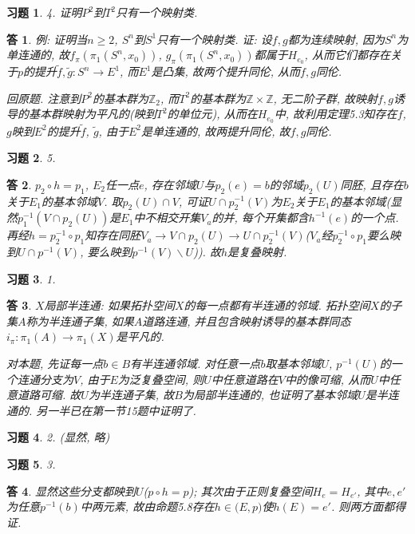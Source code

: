\documentclass{ctexart}%
\newtheorem*{exercise}{习题}
\newtheorem*{solution}{答}
\theoremstyle{definition}
\theoremstyle{remark}
\begin{document}
\begin{exercise}4. 证明$P^2$到$T^2$只有一个映射类.
\end{exercise}
\begin{solution}
例: 证明当$n\geq 2$, $S^n$到$S^1$只有一个映射类. 证: 设$f,g$都为连续映射, 因为$S^n$为单连通的, 故$f_\pi(\pi_1(S^n,x_0))$, $g_\pi(\pi_1(S^n,x_0))$都属于$H_{e_0}$, 从而它们都存在关于$p$的提升$\tilde{f}, \tilde{g}:S^n\rightarrow E^1$, 而$E^1$是凸集, 故两个提升同伦, 从而$f,g$同伦. 

回原题. 注意到$P^2$的基本群为$\mathbb{Z}_2$, 而$T^2$的基本群为$\mathbb{Z}\times \mathbb{Z}$, 无二阶子群, 故映射$f,g$诱导的基本群映射为平凡的(映到$T^2$的单位元), 从而在$H_{e_0}$中, 故利用定理5.3知存在$f$, $g$映到$E^2$的提升$\tilde{f}$, $\tilde{g}$, 由于$E^2$是单连通的, 故两提升同伦, 故$f,g$同伦. 
\end{solution}

\begin{exercise}5.
\end{exercise}
\begin{solution}
$p_2\circ h = p_1$, $E_2$任一点$e$, 存在邻域$U$与$p_2(e)=b$的邻域$p_2(U)$同胚, 且存在$b$关于$E_1$的基本邻域$V$. 取$p_2(U)\cap V$, 可证$U\cap p^{-1}_2(V)$为$E_2$关于$E_1$的基本邻域(显然$p^{-1}_1(V\cap p_2(U))$是$E_1$中不相交开集$V_a$的并, 每个开集都含$h^{-1}(e)$的一个点. 再经$h=p^{-1}_2\circ p_1$知存在同胚$V_a\rightarrow V\cap p_2(U)\rightarrow U\cap p^{-1}_2(V)$($V_a$经$p^{-1}_2\circ p_1$要么映到$U\cap p^{-1}(V)$, 要么映到$p^{-1}(V)\backslash U$)). 故$h$是复叠映射.
\end{solution}

\begin{exercise}1.
\end{exercise}
\begin{solution}
$X$局部半连通: 如果拓扑空间$X$的每一点都有半连通的邻域. 拓扑空间$X$的子集$A$称为半连通子集, 如果$A$道路连通, 并且包含映射诱导的基本群同态$i_\pi:\pi_1(A)\rightarrow \pi_1(X)$是平凡的. 

对本题, 先证每一点$b\in B$有半连通邻域. 对任意一点$b$取基本邻域$U$, $p^{-1}(U)$的一个连通分支为$V$, 由于$E$为泛复叠空间, 则$U$中任意道路在$V$中的像可缩, 从而$U$中任意道路可缩. 故$U$为半连通子集, 故$B$为局部半连通的, 也证明了基本邻域$U$是半连通的. 另一半已在第一节15题中证明了.
\end{solution}

\begin{exercise}2. (显然, 略)
\end{exercise}

\begin{exercise}3. 
\end{exercise}
\begin{solution}
显然这些分支都映到$U$($p\circ h= p$); 其次由于正则复叠空间$H_e=H_{e'}$, 其中$e,e'$为任意$p^{-1}(b)$中两元素, 故由命题5.8存在$h\in \mathfrak(E,p)$使$h(E)=e'$. 则两方面都得证.
\end{solution}
\end{document}
